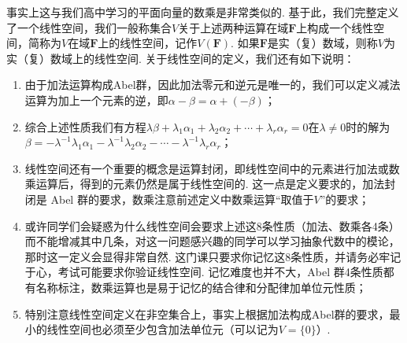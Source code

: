 事实上这与我们高中学习的平面向量的数乘是非常类似的. 基于此，我们完整定义了一个线性空间，我们一般称集合$V$关于上述两种运算在域$\mathbf{F}$上构成一个线性空间，简称为$V$在域$\mathbf{F}$上的线性空间，记作$V(\mathbf{F})$. 如果$\mathbf{F}$是实（复）数域，则称$V$为实（复）数域上的线性空间. 关于线性空间的定义，我们还有如下说明：
\begin{enumerate}
    \item 由于加法运算构成Abel群，因此加法零元和逆元是唯一的，我们可以定义减法运算为加上一个元素的逆，即$\alpha-\beta=\alpha+(-\beta)$；

    \item 综合上述性质我们有方程$\lambda\beta+\lambda_1\alpha_1+\lambda_2\alpha_2+\cdots+\lambda_r\alpha_r=0$在$\lambda\neq 0$时的解为$\beta=-\lambda^{-1}\lambda_1\alpha_1-\lambda^{-1}\lambda_2\alpha_2-\cdots-\lambda^{-1}\lambda_r\alpha_r$；

    \item 线性空间还有一个重要的概念是运算封闭，即线性空间中的元素进行加法或数乘运算后，得到的元素仍然是属于线性空间的. 这一点是定义要求的，加法封闭是 Abel 群的要求，数乘注意前述定义中数乘运算``取值于$V$''的要求；

    \item 或许同学们会疑惑为什么线性空间会要求上述这8条性质（加法、数乘各4条）而不能增减其中几条，对这一问题感兴趣的同学可以学习抽象代数中的模论，那时这一定义会显得非常自然. 这门课只要求你记忆这8条性质，并请务必牢记于心，考试可能要求你验证线性空间. 记忆难度也并不大，Abel 群4条性质都有名称标注，数乘运算也是易于记忆的结合律和分配律加单位元性质；

    \item 特别注意线性空间定义在非空集合上，事实上根据加法构成Abel群的要求，最小的线性空间也必须至少包含加法单位元（可以记为$V=\{0\}$）.
\end{enumerate}

